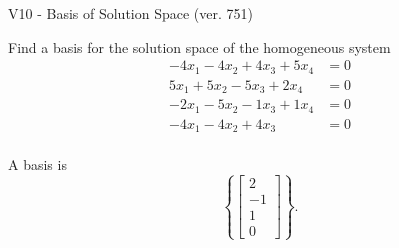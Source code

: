 \begin{exercise}
  \begin{exerciseTitle}V10 - Basis of Solution Space (ver. 751)\end{exerciseTitle}
  \begin{exerciseStatement}
    Find a basis for the solution space of the homogeneous system 
\begin{align*}
 -4 x_ 1 -4 x_ 2 + 4 x_ 3 + 5 x_ 4 &= 0  \\ 
  5 x_ 1 + 5 x_ 2 -5 x_ 3 + 2 x_ 4 &= 0  \\ 
  -2 x_ 1 -5 x_ 2 -1 x_ 3 + 1 x_ 4 &= 0  \\ 
  -4 x_ 1 -4 x_ 2 + 4 x_ 3 &= 0  \\ 
 \end{align*}


 
  \end{exerciseStatement}

  \begin{exerciseAnswer}
   A basis is   
\[\left\{\left[\begin{array}{c}
2 \\
-1 \\
1 \\
0
\end{array}\right]\right\}.\]

  


  \end{exerciseAnswer}
\end{exercise}